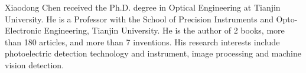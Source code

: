 \documentclass[lettersize,journal]{IEEEtran}
\begin{document}
\begin{IEEEbiography}{Xiaodong Chen} received the Ph.D. degree in Optical Engineering at Tianjin University. He is a Professor with the School of Precision Instruments and Opto-Electronic Engineering, Tianjin University. He is the author of 2 books, more than 180 articles, and more than 7 inventions. His research interests include photoelectric detection technology and instrument, image processing and machine vision detection.
\end{IEEEbiography}
\end{document}
